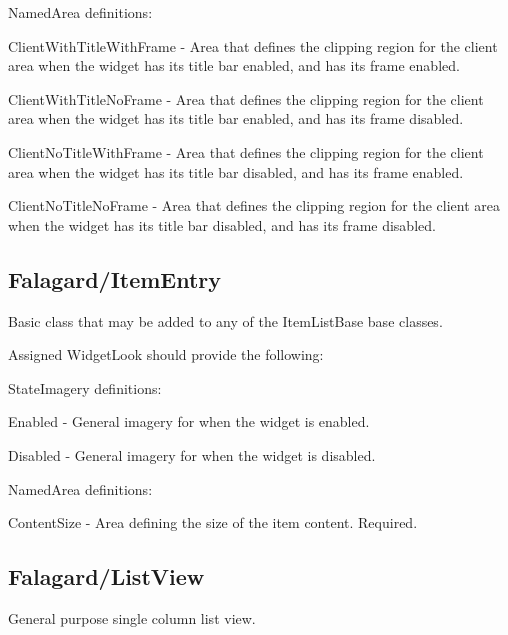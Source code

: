 \begin{DoxyItemize}
\item Named\+Area definitions\+: 
\begin{DoxyItemize}
\item Client\+With\+Title\+With\+Frame -\/ Area that defines the clipping region for the client area when the widget has its title bar enabled, and has its frame enabled. 
\item Client\+With\+Title\+No\+Frame -\/ Area that defines the clipping region for the client area when the widget has its title bar enabled, and has its frame disabled. 
\item Client\+No\+Title\+With\+Frame -\/ Area that defines the clipping region for the client area when the widget has its title bar disabled, and has its frame enabled. 
\item Client\+No\+Title\+No\+Frame -\/ Area that defines the clipping region for the client area when the widget has its title bar disabled, and has its frame disabled. 
\end{DoxyItemize}
\end{DoxyItemize}\hypertarget{fal_wr_ref_fal_wr_ref_sec_5}{}\subsection{Falagard/\+Item\+Entry}\label{fal_wr_ref_fal_wr_ref_sec_5}
Basic class that may be added to any of the Item\+List\+Base base classes.

Assigned Widget\+Look should provide the following\+: 
\begin{DoxyItemize}
\item State\+Imagery definitions\+: 
\begin{DoxyItemize}
\item Enabled -\/ General imagery for when the widget is enabled. 
\item Disabled -\/ General imagery for when the widget is disabled. 
\end{DoxyItemize}


\item Named\+Area definitions\+: 
\begin{DoxyItemize}
\item Content\+Size -\/ Area defining the size of the item content. Required. 
\end{DoxyItemize}
\end{DoxyItemize}\hypertarget{fal_wr_ref_fal_wr_ref_sec_6}{}\subsection{Falagard/\+List\+View}\label{fal_wr_ref_fal_wr_ref_sec_6}
General purpose single column list view.

